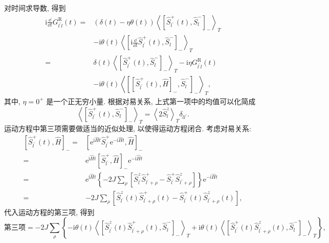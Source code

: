 对时间求导数, 得到
 \begin{align}
        \mathrm{i}\frac{\dd}{\dd t}G_{l^{\prime} l}^{\mathrm{R}}(t)=&\left( \delta(t)-\eta\theta(t) \right)\left\langle \left[ \hat{S}_{l^\prime}^+(t),\hat{S}_l^- \right]_- \right\rangle_T\nonumber\\
        &-\mathrm{i}\theta(t)\left\langle \left[ \mathrm{i}\frac{\dd}{\dd t}\hat{S}_{l^\prime}^+(t),\hat{S}_l^- \right]_- \right\rangle_T\nonumber\\
        =&\delta(t)\left\langle \left[ \hat{S}_{l^\prime}^+(t),\hat{S}_l^- \right]_- \right\rangle_T-\mathrm{i}\eta G_{l^\prime l}^{\mathrm{R}}(t)\nonumber\\
        &-\mathrm{i}\theta(t)\left\langle \left[ \left[ \hat{S}_{l^\prime}^+(t),\hat{H} \right]_-, \hat{S}_l^- \right]_- \right\rangle_T,
    \end{align}
其中, $\eta=0^+$ 是一个正无穷小量. 根据对易关系, 上式第一项中的均值可以化简成
\begin{equation}
    \left\langle\left[ \hat{S}_{l^\prime}^+(t),\hat{S}_l^- \right]_-\right\rangle_T=\left\langle 2 \hat S_l^z\right\rangle_T \delta_{ll^\prime}.
\end{equation}
运动方程中第三项需要做适当的近似处理, 以使得运动方程闭合. 考虑对易关系:
\begin{align}
        \left[ \hat{S}_{l^\prime}^+(t),\hat{H} \right]_-=&\left[ \mathrm{e}^{\mathrm{i}\hat{H}t}\hat{S}_{l^\prime}^+\mathrm{e}^{-\mathrm{i}\hat{H}t},\hat{H} \right]_-\nonumber\\
        =&\mathrm{e}^{\mathrm{i}\hat{H}t}\left[ \hat{S}_{l^\prime}^+,\hat{H} \right]_-\mathrm{e}^{-\mathrm{i}\hat{H}t}\nonumber\\
        =&\mathrm{e}^{\mathrm{i}\hat{H}t}\left\{ -2J\sum_\rho\left[ \hat{S}_{l^\prime}^z\hat{S}_{l^\prime+\rho}^+-\hat{S}_{l^\prime}^+\hat{S}_{l^\prime+\rho}^z \right] \right\}\mathrm{e}^{-\mathrm{i}\hat{H}t}\nonumber\\
        =&-2J\sum_\rho\left[ \hat{S}_{l^\prime}^z(t)\hat{S}_{l^\prime+\rho}^+(t)-\hat{S}_{l^\prime}^+(t)\hat{S}_{l^\prime+\rho}^z(t) \right],
    \end{align}
代入运动方程的第三项, 得到
\begin{equation}
        \text{第三项}=-2J\sum_\rho \left\{ -\mathrm{i}\theta(t)\left\langle \left[ \hat{S}_{l^\prime}^z(t)\hat{S}_{l^\prime+\rho}^+(t),\hat{S}_l^- \right]_- \right\rangle_T +\mathrm{i}\theta(t)\left\langle \left[ \hat{S}_{l^\prime}^+(t)\hat{S}_{l^\prime+\rho}^z(t),\hat{S}_l^- \right]_- \right\rangle_T \right\},
\end{equation}
